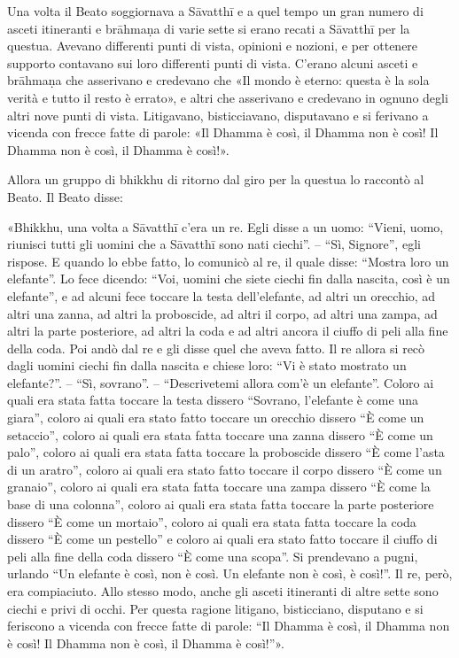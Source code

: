 
Una volta il Beato soggiornava a Sāvatthī e a quel tempo un gran numero di
asceti itineranti e brāhmaṇa di varie sette si erano recati a Sāvatthī per la
questua. Avevano differenti punti di vista, opinioni e nozioni, e per ottenere
supporto contavano sui loro differenti punti di vista. C’erano alcuni asceti e
brāhmaṇa che asserivano e credevano che «Il mondo è eterno: questa è la sola
verità e tutto il resto è errato», e altri che asserivano e credevano in ognuno
degli altri nove punti di vista. Litigavano, bisticciavano, disputavano e si
ferivano a vicenda con frecce fatte di parole: «Il Dhamma è così, il Dhamma non
è così! Il Dhamma non è così, il Dhamma è così!».

Allora un gruppo di bhikkhu di ritorno dal giro per la questua lo raccontò al
Beato. Il Beato disse:

«Bhikkhu, una volta a Sāvatthī c’era un re. Egli disse a un uomo: “Vieni, uomo,
riunisci tutti gli uomini che a Sāvatthī sono nati ciechi”. – “Sì, Signore”,
egli rispose. E quando lo ebbe fatto, lo comunicò al re, il quale disse: “Mostra
loro un elefante”. Lo fece dicendo: “Voi, uomini che siete ciechi fin dalla
nascita, così è un elefante”, e ad alcuni fece toccare la testa dell’elefante,
ad altri un orecchio, ad altri una zanna, ad altri la proboscide, ad altri il
corpo, ad altri una zampa, ad altri la parte posteriore, ad altri la coda e ad
altri ancora il ciuffo di peli alla fine della coda. Poi andò dal re e gli disse
quel che aveva fatto. Il re allora si recò dagli uomini ciechi fin dalla nascita
e chiese loro: “Vi è stato mostrato un elefante?”. – “Sì, sovrano”. –
“Descrivetemi allora com’è un elefante”. Coloro ai quali era stata fatta toccare
la testa dissero “Sovrano, l’elefante è come una giara”, coloro ai quali era
stato fatto toccare un orecchio dissero “È come un setaccio”, coloro ai quali
era stata fatta toccare una zanna dissero “È come un palo”, coloro ai quali era
stata fatta toccare la proboscide dissero “È come l’asta di un aratro”, coloro
ai quali era stato fatto toccare il corpo dissero “È come un granaio”, coloro ai
quali era stata fatta toccare una zampa dissero “È come la base di una colonna”,
coloro ai quali era stata fatta toccare la parte posteriore dissero “È come un
mortaio”, coloro ai quali era stata fatta toccare la coda dissero “È come un
pestello” e coloro ai quali era stato fatto toccare il ciuffo di peli alla fine
della coda dissero “È come una scopa”. Si prendevano a pugni, urlando “Un
elefante è così, non è così. Un elefante non è così, è così!”. Il re, però, era
compiaciuto. Allo stesso modo, anche gli asceti itineranti di altre sette sono
ciechi e privi di occhi. Per questa ragione litigano, bisticciano, disputano e
si feriscono a vicenda con frecce fatte di parole: “Il Dhamma è così, il Dhamma
non è così! Il Dhamma non è così, il Dhamma è così!”».

